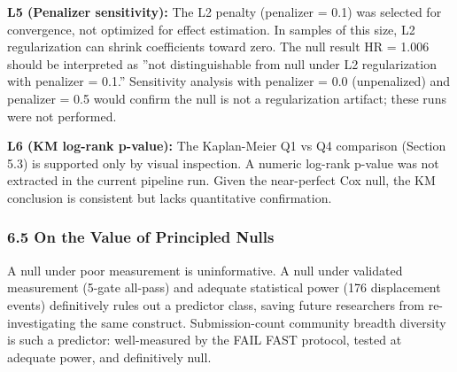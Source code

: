 \textbf{L5 (Penalizer sensitivity):} The L2 penalty (penalizer = 0.1) was selected for convergence, not optimized for effect estimation. In samples of this size, L2 regularization can shrink coefficients toward zero. The null result HR = 1.006 should be interpreted as ''not distinguishable from null under L2 regularization with penalizer = 0.1.'' Sensitivity analysis with penalizer = 0.0 (unpenalized) and penalizer = 0.5 would confirm the null is not a regularization artifact; these runs were not performed.

\textbf{L6 (KM log-rank p-value):} The Kaplan-Meier Q1 vs Q4 comparison (Section 5.3) is supported only by visual inspection. A numeric log-rank p-value was not extracted in the current pipeline run. Given the near-perfect Cox null, the KM conclusion is consistent but lacks quantitative confirmation.

\subsubsection{6.5 On the Value of Principled Nulls}

A null under poor measurement is uninformative. A null under validated measurement (5-gate all-pass) and adequate statistical power (176 displacement events) definitively rules out a predictor class, saving future researchers from re-investigating the same construct. Submission-count community breadth diversity is such a predictor: well-measured by the FAIL FAST protocol, tested at adequate power, and definitively null.

